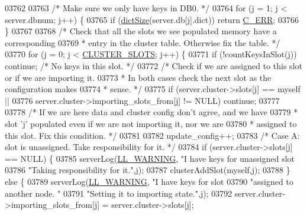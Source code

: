 \begin{DoxyCode}
{{{{{{{{{{{{{{{{{{{{{{{{{{{{{{{{{{{{{{{{{{{{{{{{{{{{{{{{{{{{{{03762 
03763     \textcolor{comment}{/* Make sure we only have keys in DB0. */}
03764     \textcolor{keywordflow}{for} (j = 1; j < server.dbnum; j++) \{
03765         \textcolor{keywordflow}{if} (\hyperlink{dict_8h_af193430dd3d5579a52b194512f72c1f0}{dictSize}(server.db[j].dict)) \textcolor{keywordflow}{return} \hyperlink{server_8h_af98ac28d5f4d23d7ed5985188e6fb7d1}{C\_ERR};
03766     \}
03767 
03768     \textcolor{comment}{/* Check that all the slots we see populated memory have a corresponding}
03769 \textcolor{comment}{     * entry in the cluster table. Otherwise fix the table. */}
03770     \textcolor{keywordflow}{for} (j = 0; j < \hyperlink{cluster_8h_aa3e2cb951eebb16725ecc3f5beefd9fd}{CLUSTER\_SLOTS}; j++) \{
03771         \textcolor{keywordflow}{if} (!countKeysInSlot(j)) \textcolor{keywordflow}{continue}; \textcolor{comment}{/* No keys in this slot. */}
03772         \textcolor{comment}{/* Check if we are assigned to this slot or if we are importing it.}
03773 \textcolor{comment}{         * In both cases check the next slot as the configuration makes}
03774 \textcolor{comment}{         * sense. */}
03775         \textcolor{keywordflow}{if} (server.cluster->slots[j] == myself ||
03776             server.cluster->importing\_slots\_from[j] != NULL) \textcolor{keywordflow}{continue};
03777 
03778         \textcolor{comment}{/* If we are here data and cluster config don't agree, and we have}
03779 \textcolor{comment}{         * slot 'j' populated even if we are not importing it, nor we are}
03780 \textcolor{comment}{         * assigned to this slot. Fix this condition. */}
03781 
03782         update\_config++;
03783         \textcolor{comment}{/* Case A: slot is unassigned. Take responsibility for it. */}
03784         \textcolor{keywordflow}{if} (server.cluster->slots[j] == NULL) \{
03785             serverLog(\hyperlink{server_8h_a31229b9334bba7d6be2a72970967a14b}{LL\_WARNING}, \textcolor{stringliteral}{"I have keys for unassigned slot %
03786                                     \textcolor{stringliteral}{"Taking responsibility for it."},j);
03787             clusterAddSlot(myself,j);
03788         \} \textcolor{keywordflow}{else} \{
03789             serverLog(\hyperlink{server_8h_a31229b9334bba7d6be2a72970967a14b}{LL\_WARNING}, \textcolor{stringliteral}{"I have keys for slot %
03790                                     \textcolor{stringliteral}{"assigned to another node. "}
03791                                     \textcolor{stringliteral}{"Setting it to importing state."},j);
03792             server.cluster->importing\_slots\_from[j] = server.cluster->slots[j];
}}}}}}}}}}}}}}}}}}}}}}}}}}}}}}}}}}}}}}}}}}}}}}}}}}}}}}}}}}}}}}}}
\end{DoxyCode}
